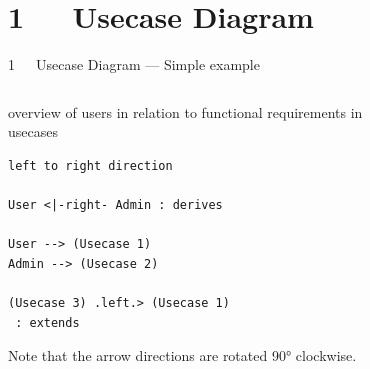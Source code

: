 \documentclass{beamer}
\begin{document}
\section{1~~~Usecase Diagram}

\begin{frame}[fragile]{1~~~Usecase Diagram — Simple example}
\begin{columns}
\begin{column}{.6\textwidth}
overview of \alert{users} in relation to functional requirements in \alert{usecases}
\begin{verbatim}
left to right direction

User <|-right- Admin : derives

User --> (Usecase 1)
Admin --> (Usecase 2)

(Usecase 3) .left.> (Usecase 1)
 : extends
\end{verbatim}
Note that the arrow directions are rotated 90° clockwise.
\end{column}
\begin{column}{.4\textwidth}
\begin{figure}
\def\centering\svgwidth{\columnwidth}
\resizebox{!}{.5\textheight}{}
\end{figure}
\end{column}
\end{columns}
\end{frame}
\end{document}

